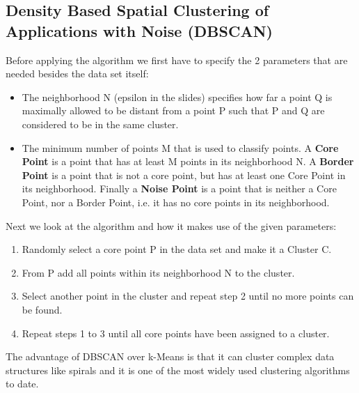\documentclass{article}
\begin{document}
\subsection{\textbf{D}ensity \textbf{B}ased \textbf{S}patial \textbf{C}lustering of \textbf{A}pplications with \textbf{N}oise (DBSCAN)}
Before applying the algorithm we first have to specify the 2 parameters that are needed besides the data set itself: 

\begin{itemize}
	\item The neighborhood N (epsilon in the slides) specifies how far a point Q is maximally allowed to be distant from a point P such that P and Q are considered to be in the same cluster. 
	
	\item The minimum number of points M that is used to classify points. A \textbf{Core Point} is a point that has at least M points in its neighborhood N. A \textbf{Border Point} is a point that is not a core point, but has at least one Core Point in its neighborhood. Finally a \textbf{Noise Point} is a point that is neither a Core Point, nor a Border Point, i.e. it has no core points in its neighborhood. 
\end{itemize}

Next we look at the algorithm and how it makes use of the given parameters: 
\begin{enumerate}
	\item Randomly select a core point P in the data set and make it a Cluster C. 
	
	\item From P add all points within its neighborhood N to the cluster. 
	
	\item Select another point in the cluster and repeat step 2 until no more points can be found. 
	
	\item Repeat steps 1 to 3 until all core points have been assigned to a cluster. 
\end{enumerate}

\noindent The advantage of DBSCAN over k-Means is that it can cluster complex data structures like spirals and it is one of the most widely used clustering algorithms to date. 
\end{document}

